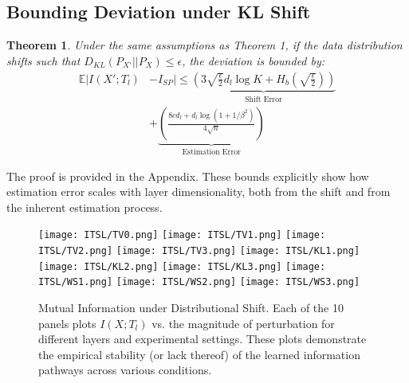 \documentclass[conference]{IEEEtran}
\newtheorem{theorem}{Theorem}
\begin{document}
\subsection{Bounding Deviation under KL Shift}
\begin{theorem}
Under the same assumptions as Theorem 1, if the data distribution shifts such that $D_{KL}(P_{X'}||P_X) \le \epsilon$, the deviation is bounded by:
\begin{equation}
\begin{split}
\mathbb{E}|I(X'; T_l) &- \hat{I}_{SP}| \le \underbrace{\left(3\sqrt{\frac{\epsilon}{2}} d_l \log K + H_b(\sqrt{\frac{\epsilon}{2}})\right)}_{\text{Shift Error}} \\
& + \underbrace{\left(\frac{8cd_l + d_l \log(1+1/\beta^2)}{4\sqrt{n}}\right)}_{\text{Estimation Error}}
\end{split}
\end{equation}
\end{theorem}
The proof is provided in the Appendix. These bounds explicitly show how estimation error scales with layer dimensionality, both from the shift and from the inherent estimation process.

\begin{figure*}[!t]
\centering
\texttt{[image: ITSL/TV0.png]}\hfill
\texttt{[image: ITSL/TV1.png]}
\vspace{1em}
\texttt{[image: ITSL/TV2.png]}\hfill
\texttt{[image: ITSL/TV3.png]}
\vspace{1em}
\texttt{[image: ITSL/KL1.png]}\hfill
\texttt{[image: ITSL/KL2.png]}
\vspace{1em}
\texttt{[image: ITSL/KL3.png]}\hfill
\texttt{[image: ITSL/WS1.png]}
\vspace{1em}
\texttt{[image: ITSL/WS2.png]}\hfill
\texttt{[image: ITSL/WS3.png]}
\caption{Mutual Information under Distributional Shift. Each of the 10 panels plots $I(X; T_l)$ vs. the magnitude of perturbation for different layers and experimental settings. These plots demonstrate the empirical stability (or lack thereof) of the learned information pathways across various conditions.}
\label{fig:main_results}
\end{figure*}
\end{document}
